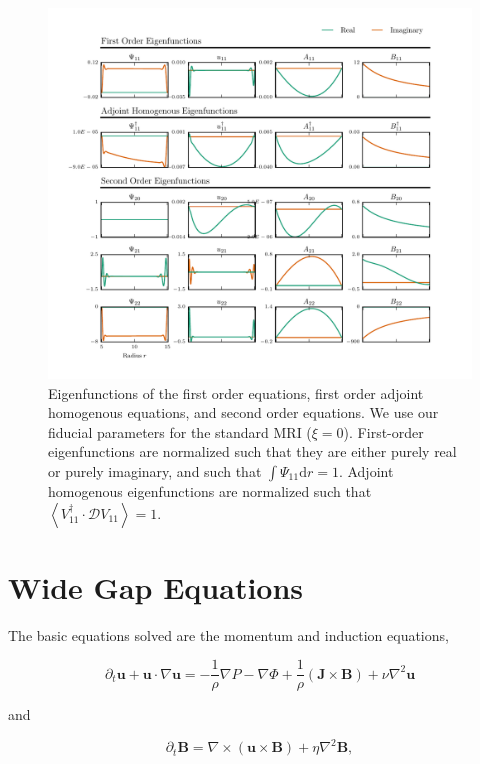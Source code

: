 \documentclass{emulateapj}
\newcommand{\beq}{\begin{equation}}
\newcommand{\eeq}{\end{equation}}
\begin{document}
\begin{figure}
\centering
\includegraphics[width=\textwidth]{../python/widegap/figures/orders_1_2_widegap_fiducial_eigenfunctions.pdf}
\caption{Eigenfunctions of the first order equations, first order adjoint homogenous equations, and second order equations. We use our fiducial parameters for the standard MRI ($\xi = 0$). First-order eigenfunctions are normalized such that they are either purely real or purely imaginary, and such that $\int \Psi_{11} \mathrm{d}r = 1$. Adjoint homogenous eigenfunctions are normalized such that $\left< V_{11}^\dagger \cdot \mathcal{D} V_{11} \right> = 1$.}\label{fig:linear_eigenfunctions}
\end{figure}

\section{Wide Gap Equations}

The basic equations solved are the momentum and induction equations,

\beq\label{momentum}
\partial_t \mathbf{u} + \mathbf{u} \cdot \nabla \mathbf{u} = -\frac{1}{\rho}\nabla P - \nabla\Phi + \frac{1}{\rho} \left(\mathbf{J}\times\mathbf{B}\right) + \nu\nabla^2 \mathbf{u} 
\eeq

and

\beq\label{induction}
\partial_t \mathbf{B} = \nabla \times \left(\mathbf{u} \times \mathbf{B}\right) + \eta\nabla^2\mathbf{B},
\eeq
\end{document}
